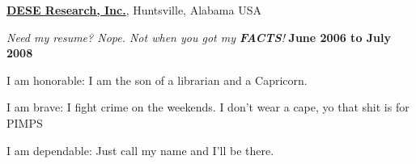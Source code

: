 \documentclass[8pt]{article}
\newenvironment{outerlist}[1][\enskip\textbullet]%
        {\begin{enumerate}[#1]}{\end{enumerate}%
         \vspace{-.3\baselineskip}}
\newenvironment{innerlist}[1][\enskip\textbullet]%
        {\begin{compactenum}[#1]}{\end{compactenum}}
\newcommand{\blankline}{\quad\pagebreak[2]}
\def\CC{{C\nolinebreak[4]\hspace{-.05em}\raisebox{.4ex}{\tiny\bf ++}}}
\begin{document}
\blankline
\newpage
\href{http://www.dese.com/}{\textbf{DESE Research, Inc.}}, 
Huntsville, Alabama USA
\begin{outerlist}

\item[] \textit{Need my resume? Nope. Not when you got my \textbf{FACTS}!}%
        \hfill \textbf{June 2006 to July 2008}
\begin{innerlist}
\item I am honorable: I am the son of a librarian and a Capricorn.
\item I am brave: I fight crime on the weekends. I don't wear a cape, yo that shit is for PIMPS
\item I am dependable: Just call my name and I'll be there.
\end{innerlist}
\end{outerlist}
\blankline

%
\end{document}
